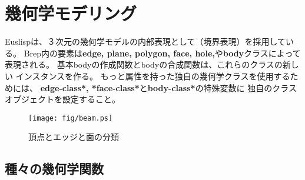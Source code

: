 \section{\label{Geometry}幾何学モデリング}

Euslispは、３次元の幾何学モデルの内部表現として（境界表現）を採用している。
Brep内の要素は{\bf edge, plane, polygon, face, hole,}や{\bf body}クラスによって
表現される。
基本bodyの作成関数とbodyの合成関数は、これらのクラスの新しい
インスタンスを作る。
もっと属性を持った独自の幾何学クラスを使用するためには、
{\bf *edge-class*, *face-class*}と{\bf *body-class*}の特殊変数に
独自のクラスオブジェクトを設定すること。

\begin{figure}
\begin{center}
\texttt{[image: fig/beam.ps]}
\end{center}
\caption{頂点とエッジと面の分類}
\end{figure}

\subsection{種々の幾何学関数}

